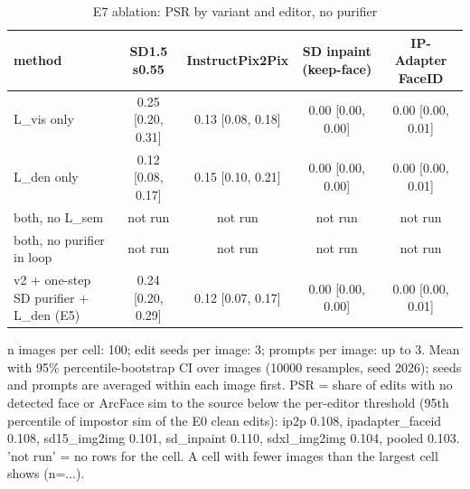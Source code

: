 \begin{table}[t]
\centering
\small
\begin{tabular}{lcccc}
\toprule
method & SD1.5 s0.55 & InstructPix2Pix & SD inpaint (keep-face) & IP-Adapter FaceID \\
\midrule
L\_vis only & 0.25 [0.20, 0.31] & 0.13 [0.08, 0.18] & 0.00 [0.00, 0.00] & 0.00 [0.00, 0.01] \\
L\_den only & 0.12 [0.08, 0.17] & 0.15 [0.10, 0.21] & 0.00 [0.00, 0.00] & 0.00 [0.00, 0.01] \\
both, no L\_sem & not run & not run & not run & not run \\
both, no purifier in loop & not run & not run & not run & not run \\
v2 + one-step SD purifier + L\_den (E5) & 0.24 [0.20, 0.29] & 0.12 [0.07, 0.17] & 0.00 [0.00, 0.00] & 0.00 [0.00, 0.01] \\
\bottomrule
\end{tabular}
\caption{E7 ablation: PSR by variant and editor, no purifier}
\label{tab:e7_editors}
\par\footnotesize n images per cell: 100; edit seeds per image: 3; prompts per image: up to 3. Mean with 95\% percentile-bootstrap CI over images (10000 resamples, seed 2026); seeds and prompts are averaged within each image first. PSR = share of edits with no detected face or ArcFace sim to the source below the per-editor threshold (95th percentile of impostor sim of the E0 clean edits): ip2p 0.108, ipadapter\_faceid 0.108, sd15\_img2img 0.101, sd\_inpaint 0.110, sdxl\_img2img 0.104, pooled 0.103. 'not run' = no rows for the cell. A cell with fewer images than the largest cell shows (n=...).
\end{table}
